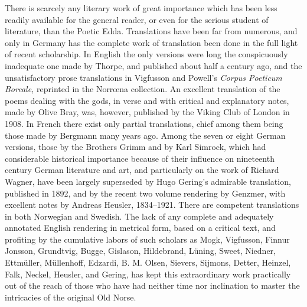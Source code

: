 \documentclass{scrbook}
\newcommand{\ndash}{--}
\begin{document}
There is scarcely any literary work of great importance which has been less readily available for the general reader, or even for the serious student of literature, than the Poetic Edda. Translations have been far from numerous, and only in Germany has the complete work of translation been done in the full light of recent scholarship. In English the only versions were long the conspicuously inadequate one made by Thorpe, and published about half a century ago, and the unsatisfactory prose translations in Vigfusson and Powell's \emph{Corpus Poeticum Boreale,} reprinted in the Norrœna collection. An excellent translation of the poems dealing with the gods, in verse and with critical and explanatory notes, made by Olive Bray, was, however, published by the Viking Club of London in 1908. In French there exist only partial translations, chief among them being those made by Bergmann many years ago. Among the seven or eight German versions, those by the Brothers Grimm and by Karl Simrock, which had considerable historical importance because of their influence on nineteenth century German literature and art, and particularly on the work of Richard Wagner, have been largely superseded by Hugo Gering's admirable translation, published in 1892, and by the recent two volume rendering by Genzmer, with excellent notes by Andreas Heusler, 1834\ndash1921. There are competent translations in both Norwegian and Swedish. The lack of any complete and adequately annotated English rendering in metrical form, based on a critical text, and profiting by the cumulative labors of such scholars as Mogk, Vigfusson, Finnur Jonsson, Grundtvig, Bugge, Gislason, Hildebrand, Lüning, Sweet, Niedner, Ettmüller, Müllenhoff, Edzardi, B. M. Olsen, Sievers, Sijmons, Detter, Heinzel, Falk, Neckel, Heusler, and Gering, has kept this extraordinary work practically out of the reach of those who have had neither time nor inclination to master the intricacies of the original Old Norse.
\end{document}
